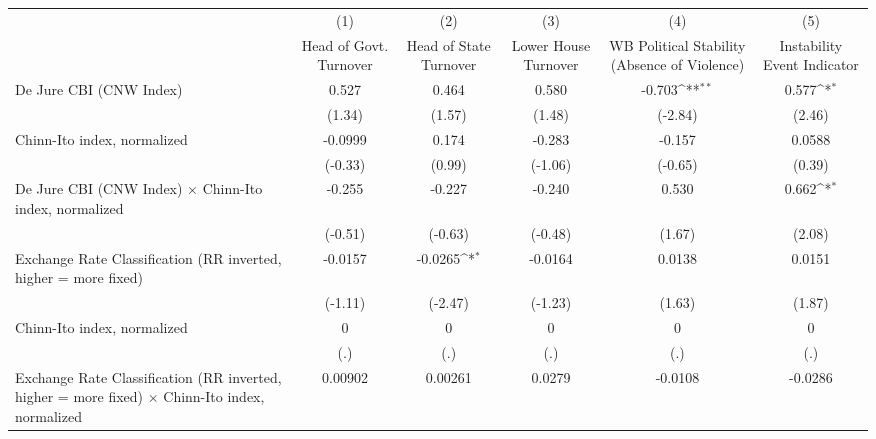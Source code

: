 {
\def\sym#1{\ifmmode^{#1}\else\(^{#1}\)\fi}
\begin{tabular*}{\linewidth}{@{\hskip\tabcolsep\extracolsep\fill}l*{5}{c}}
\toprule
                &\multicolumn{1}{c}{(1)}&\multicolumn{1}{c}{(2)}&\multicolumn{1}{c}{(3)}&\multicolumn{1}{c}{(4)}&\multicolumn{1}{c}{(5)}\\
                &\multicolumn{1}{c}{Head of Govt. Turnover}&\multicolumn{1}{c}{Head of State Turnover}&\multicolumn{1}{c}{Lower House Turnover}&\multicolumn{1}{c}{WB Political Stability (Absence of Violence)}&\multicolumn{1}{c}{Instability Event Indicator}\\
\midrule
De Jure CBI (CNW Index)&    0.527         &    0.464         &    0.580         &   -0.703\sym{**} &    0.577\sym{*}  \\
                &   (1.34)         &   (1.57)         &   (1.48)         &  (-2.84)         &   (2.46)         \\
\addlinespace
Chinn-Ito index, normalized&  -0.0999         &    0.174         &   -0.283         &   -0.157         &   0.0588         \\
                &  (-0.33)         &   (0.99)         &  (-1.06)         &  (-0.65)         &   (0.39)         \\
\addlinespace
De Jure CBI (CNW Index) $\times$ Chinn-Ito index, normalized&   -0.255         &   -0.227         &   -0.240         &    0.530         &    0.662\sym{*}  \\
                &  (-0.51)         &  (-0.63)         &  (-0.48)         &   (1.67)         &   (2.08)         \\
\addlinespace
Exchange Rate Classification (RR inverted, higher = more fixed)&  -0.0157         &  -0.0265\sym{*}  &  -0.0164         &   0.0138         &   0.0151         \\
                &  (-1.11)         &  (-2.47)         &  (-1.23)         &   (1.63)         &   (1.87)         \\
\addlinespace
Chinn-Ito index, normalized&        0         &        0         &        0         &        0         &        0         \\
                &      (.)         &      (.)         &      (.)         &      (.)         &      (.)         \\
\addlinespace
Exchange Rate Classification (RR inverted, higher = more fixed) $\times$ Chinn-Ito index, normalized&  0.00902         &  0.00261         &   0.0279         &  -0.0108         &  -0.0286         \\

\end{tabular*}}
